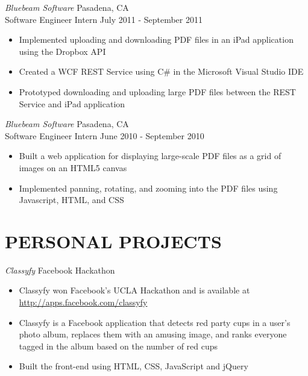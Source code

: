 \documentclass{res}
\begin{document}
\begin{resume}
 {\sl Bluebeam Software} \hfill Pasadena, CA \\[2pt]
 Software Engineer Intern \hfill    July 2011 - September 2011

   \begin{itemize} \itemsep -2pt
   \item  Implemented uploading and downloading PDF files in an iPad application using the Dropbox API
   \item Created a WCF REST Service using C\# in the Microsoft Visual Studio IDE
   \item Prototyped downloading and uploading large PDF files between the REST Service and iPad application
   \end{itemize} \vspace{-6pt}


 {\sl Bluebeam Software} \hfill Pasadena, CA \\[2pt]
 Software Engineer Intern \hfill    June 2010 - September 2010

   \begin{itemize} \itemsep -2pt
   \item  Built a web application for displaying large-scale PDF files as a grid of images on an HTML5 canvas
   \item Implemented panning, rotating, and zooming into the PDF files using Javascript, HTML, and CSS
   \end{itemize} \vspace{-6pt}

\section{PERSONAL PROJECTS}
\vspace{8pt}

 {\sl Classyfy} \hfill Facebook Hackathon

   \begin{itemize} \itemsep -2pt
   \item  Classyfy won Facebook’s UCLA Hackathon and is available at \underline{http://apps.facebook.com/classyfy}
   \item Classyfy is a Facebook application that detects red party cups in a user’s photo album, replaces them with an amusing image, and ranks everyone tagged in the album based on the number of red cups
    \item Built the front-end using HTML, CSS, JavaScript and jQuery
    \end{itemize} \vspace{-6pt}


\end{resume}
\end{document}
